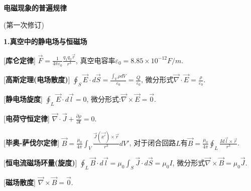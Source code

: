 


 \begin{center} 
 \Large \textbf{电磁现象的普遍规律}\par
 (第一次修订)
\end{center}
 
\large 
\begin{center}
 \textbf{1.真空中的静电场与恒磁场}
\end{center}

[\textbf{库仑定律}] $\vec F=\frac{1}{4\pi\varepsilon_0}\frac{q_1q_2\vec r}{r^3}$, 真空电容率$\varepsilon_0=8.85\times 10^{-12}F/m$.\par

[\textbf{高斯定理(电场散度)}] $\oint_S\vec E\cdot d\vec S=\frac{\int_V\rho dV}{\varepsilon_0}=\frac{Q}{\varepsilon_0}$, 微分形式$\vec \nabla\cdot\vec E=\frac{\rho}{\varepsilon_0}$.\par

[\textbf{静电场旋度}] $\oint_L\vec E\cdot d\vec l=0$, 微分形式:$\vec \nabla\times\vec E=\vec 0$.\par

[\textbf{电荷守恒定律}] $\vec \nabla\cdot \vec J+\frac{\partial \rho}{\partial t}=0$.\par

[\textbf{毕奥-萨伐尔定律}] $\vec B=\frac{\mu_0}{4\pi}\int_V\frac{\vec J(\vec{x'})\times \vec r}{r^3}dV'$, 对于闭合回路$L$有$\vec B=\frac{\mu_0}{4\pi}\oint_L\frac{Id\vec l\times\vec r}{r^3}$.\par

[\textbf{恒电流磁场环量(旋度)}] $\oint_L \vec B\cdot d\vec l=\mu_0\int_S\vec J\cdot d\vec S=\mu_0I$, 微分形式$\vec \nabla\times\vec B=\mu_0\vec J$.\par

[\textbf{磁场散度}] $\vec\nabla\times\vec B=\vec 0$.\par

